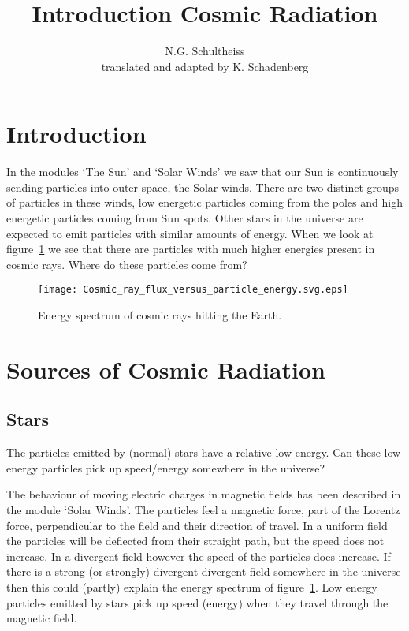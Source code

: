 


\author{N.G. Schultheiss \\ translated and adapted by K. Schadenberg}
\date{}
\title{Introduction Cosmic Radiation}



\maketitle

\section{Introduction}
In the modules `The Sun' and `Solar Winds' we saw that our Sun is continuously sending particles into outer space, the Solar winds. There are two distinct groups of particles in these winds, low energetic particles coming from the poles and high energetic particles coming from Sun spots. Other stars in the universe are expected to emit particles with similar amounts of energy. When we look at figure~\ref{fig:spectrum} we see that there are particles with much higher energies present in cosmic rays. Where do these particles come from?

\begin{figure}\begin{center}
\texttt{[image: Cosmic\_ray\_flux\_versus\_particle\_energy.svg.eps]}%
\caption{Energy spectrum of cosmic rays hitting the Earth.}\label{fig:spectrum}
\end{center}\end{figure}

\section{Sources of Cosmic Radiation}
\subsection{Stars}
The particles emitted by (normal) stars have a relative low energy. Can these low energy particles pick up speed/energy somewhere in the universe?

The behaviour of moving electric charges in magnetic fields has been described in the module `Solar Winds'. The particles feel a magnetic force, part of the Lorentz force, perpendicular to the field and their direction of travel. In a uniform field the particles will be deflected from their straight path, but the speed does not increase. In a divergent field however the speed of the particles does increase. If there is a strong (or strongly) divergent divergent field somewhere in the universe then this could (partly) explain the energy spectrum of figure~\ref{fig:spectrum}. Low energy particles emitted by stars pick up speed (energy) when they travel through the magnetic field.

